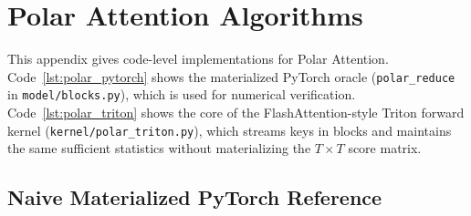 \documentclass{article} %
\begin{document}
\section{Polar Attention Algorithms}
\label{appendix:polar_algorithms}

This appendix gives code-level implementations for Polar Attention. Code~\ref{lst:polar_pytorch}
shows the materialized PyTorch oracle (\texttt{polar\_reduce} in \texttt{model/blocks.py}),
which is used for numerical verification. Code~\ref{lst:polar_triton} shows the core of the
FlashAttention-style Triton forward kernel (\texttt{kernel/polar\_triton.py}), which streams
keys in blocks and maintains the same sufficient statistics without materializing the
$T \times T$ score matrix.

\clearpage
\subsection{Naive Materialized PyTorch Reference}
\end{document}
